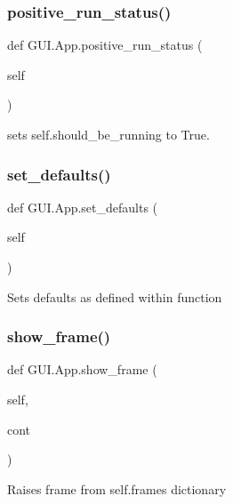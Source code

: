 \subsubsection{\texorpdfstring{positive\_run\_status()}{positive\_run\_status()}}
{\footnotesize\ttfamily def G\+U\+I.\+App.\+positive\+\_\+run\+\_\+status (\begin{DoxyParamCaption}\item[{}]{self }\end{DoxyParamCaption})}

\begin{DoxyVerb}sets self.should_be_running to True.
\end{DoxyVerb}
 \mbox{\label{class_g_u_i_1_1_app_a8f5a8990504bafa4100ca2e84ca921eb}} 
\subsubsection{\texorpdfstring{set\_defaults()}{set\_defaults()}}
{\footnotesize\ttfamily def G\+U\+I.\+App.\+set\+\_\+defaults (\begin{DoxyParamCaption}\item[{}]{self }\end{DoxyParamCaption})}

\begin{DoxyVerb}Sets defaults as defined within function
\end{DoxyVerb}
 \mbox{\label{class_g_u_i_1_1_app_a6168406499bb44b93e6a7c63a65b2a39}} 
\subsubsection{\texorpdfstring{show\_frame()}{show\_frame()}}
{\footnotesize\ttfamily def G\+U\+I.\+App.\+show\+\_\+frame (\begin{DoxyParamCaption}\item[{}]{self,  }\item[{}]{cont }\end{DoxyParamCaption})}

\begin{DoxyVerb}Raises frame from self.frames dictionary
\end{DoxyVerb}
 

